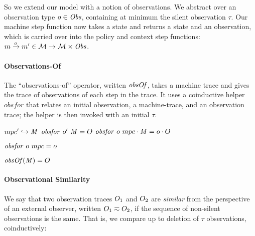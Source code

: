 \documentclass[acmsmall,review,anonymous]{acmart}\settopmatter{printfolios=true,printccs=false,printacmref=false}
\begin{document}
{So we extend our model with a notion of observations. We abstract over an
observation type \(\obs \in \OBSS\), containing at minimum the silent observation
\(\tau\). Our machine step function now takes a state and returns a state and an observation,
which is carried over into the policy and context step functions:
%
$\mach \stepsto[\obs] \mach' \in \MACHS \rightarrow \MACHS \times \OBSS $.
%

\paragraph*{Observations-Of}

The ``observations-of'' operator, written \(\obsof\), takes a machine trace and
gives the trace of observations of each step in
the trace. It uses a coinductive helper \(\mathit{obsfor}\) that relates an
initial observation, a machine-trace, and an observation trace; the helper is
then invoked with an initial \(\tau\).

\begin{minipage}[b]{.55\textwidth}
                {\(\mpcstatename' \hookrightarrow \MPCT\)}
                {\(\mathit{obsfor} ~ \obs' ~ \MPCT = \obsT\)}
                {\(\mathit{obsfor} ~ \obs ~ \notfinished{\mpcstatename}{\MPCT} = \notfinished{\obs}{\obsT}\)}%
\end{minipage}
\begin{minipage}[b]{.22\textwidth}
  \judgment{}
           {\(\mathit{obsfor} ~ \obs ~ \mpcstatename = \obs\)}
\end{minipage}
\begin{minipage}[b]{.22\textwidth}
         {\(\obsof(\MPCT) = \obsT\)}
\end{minipage}

\paragraph*{Observational Similarity}

We say that two observation traces $\obsT_1$ and $\obsT_2$ are {\em similar}
from the perspective of an external observer, written \(\obsT_1 \eqsim
\obsT_2\), if the sequence of non-silent observations is the same. That is, we
compare up to deletion of \(\tau\) observations, coinductively:

}
\end{document}
